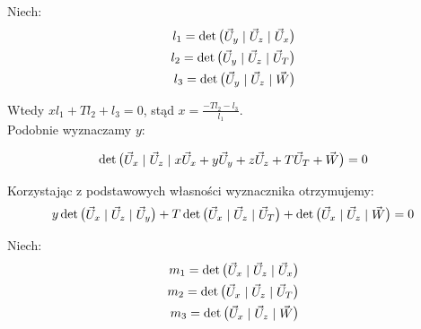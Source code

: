\documentclass[]{mwart}
\theoremstyle{definition}
\newcommand{\matsp}{\hspace*{1mm} | \hspace*{1mm}}
\begin{document}
Niech:
\begin{align*}
	l_1 = \det \begin{pmatrix} \vec U_y \matsp \vec U_z \matsp \vec U_x \end{pmatrix} \\
	l_2 = \det \begin{pmatrix} \vec U_y \matsp \vec U_z \matsp \vec U_T \end{pmatrix} \\
	l_3 = \det \begin{pmatrix} \vec U_y \matsp \vec U_z \matsp  \vec W \end{pmatrix}
\end{align*}

Wtedy $xl_1 + Tl_2 + l_3 = 0$, stąd $x = \frac{-Tl_2 - l_3}{l_1}$. \\

Podobnie wyznaczamy $y$:

\[
	\det
		\begin{pmatrix}
			\vec U_x \matsp
			\vec U_z \matsp
			x \vec U_x + y \vec U_y + z \vec U_z + T \vec U_T + \vec W
		\end{pmatrix} = 0
\]

Korzystając z podstawowych własności wyznacznika otrzymujemy:
\[
	y \det
		\begin{pmatrix}
			\vec U_x \matsp
			\vec U_z \matsp
			\vec U_y
		\end{pmatrix}
	+ T \det
		\begin{pmatrix}
			\vec U_x \matsp
			\vec U_z \matsp
			\vec U_T
		\end{pmatrix}
		+ \det
			\begin{pmatrix}
				\vec U_x \matsp
				\vec U_z \matsp
				\vec W
			\end{pmatrix}
		=0
\]

Niech:
\begin{align*}
	m_1 = \det \begin{pmatrix} \vec U_x \matsp \vec U_z \matsp \vec U_x \end{pmatrix} \\
	m_2 = \det \begin{pmatrix} \vec U_x \matsp \vec U_z \matsp \vec U_T \end{pmatrix} \\
	m_3 = \det \begin{pmatrix} \vec U_x \matsp \vec U_z \matsp  \vec W \end{pmatrix}
\end{align*}
\end{document}
